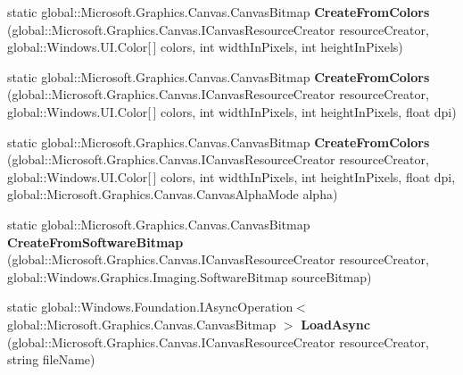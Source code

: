 \begin{DoxyCompactItemize}
\item 
\mbox{\label{class_microsoft_1_1_graphics_1_1_canvas_1_1_canvas_bitmap_aa56711d36aa2bc46baefdbf6ca694427}} 
static global\+::\+Microsoft.\+Graphics.\+Canvas.\+Canvas\+Bitmap {\bfseries Create\+From\+Colors} (global\+::\+Microsoft.\+Graphics.\+Canvas.\+I\+Canvas\+Resource\+Creator resource\+Creator, global\+::\+Windows.\+U\+I.\+Color\mbox{[}$\,$\mbox{]} colors, int width\+In\+Pixels, int height\+In\+Pixels)
\item 
\mbox{\label{class_microsoft_1_1_graphics_1_1_canvas_1_1_canvas_bitmap_a488d3b7c9e0730ddce84772fc314dedc}} 
static global\+::\+Microsoft.\+Graphics.\+Canvas.\+Canvas\+Bitmap {\bfseries Create\+From\+Colors} (global\+::\+Microsoft.\+Graphics.\+Canvas.\+I\+Canvas\+Resource\+Creator resource\+Creator, global\+::\+Windows.\+U\+I.\+Color\mbox{[}$\,$\mbox{]} colors, int width\+In\+Pixels, int height\+In\+Pixels, float dpi)
\item 
\mbox{\label{class_microsoft_1_1_graphics_1_1_canvas_1_1_canvas_bitmap_a00bad59ca00bf7edd9ce60d8a4aded82}} 
static global\+::\+Microsoft.\+Graphics.\+Canvas.\+Canvas\+Bitmap {\bfseries Create\+From\+Colors} (global\+::\+Microsoft.\+Graphics.\+Canvas.\+I\+Canvas\+Resource\+Creator resource\+Creator, global\+::\+Windows.\+U\+I.\+Color\mbox{[}$\,$\mbox{]} colors, int width\+In\+Pixels, int height\+In\+Pixels, float dpi, global\+::\+Microsoft.\+Graphics.\+Canvas.\+Canvas\+Alpha\+Mode alpha)
\item 
\mbox{\label{class_microsoft_1_1_graphics_1_1_canvas_1_1_canvas_bitmap_afcc3780c1206b46f43b6c56426ce3240}} 
static global\+::\+Microsoft.\+Graphics.\+Canvas.\+Canvas\+Bitmap {\bfseries Create\+From\+Software\+Bitmap} (global\+::\+Microsoft.\+Graphics.\+Canvas.\+I\+Canvas\+Resource\+Creator resource\+Creator, global\+::\+Windows.\+Graphics.\+Imaging.\+Software\+Bitmap source\+Bitmap)
\item 
\mbox{\label{class_microsoft_1_1_graphics_1_1_canvas_1_1_canvas_bitmap_ac19e32a381114faa58a2ff1012d712e0}} 
static global\+::\+Windows.\+Foundation.\+I\+Async\+Operation$<$ global\+::\+Microsoft.\+Graphics.\+Canvas.\+Canvas\+Bitmap $>$ {\bfseries Load\+Async} (global\+::\+Microsoft.\+Graphics.\+Canvas.\+I\+Canvas\+Resource\+Creator resource\+Creator, string file\+Name)

\end{DoxyCompactItemize}
